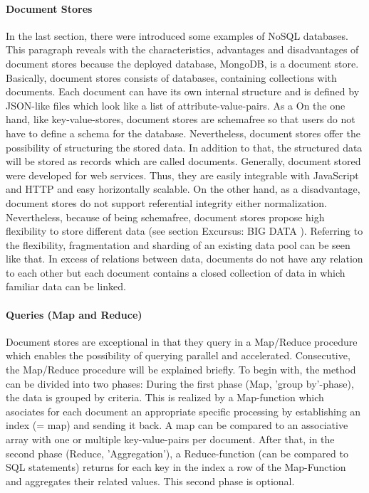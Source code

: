 \paragraph{Document Stores} \label{documentstore}

In the last section, there were introduced some examples of NoSQL databases. This paragraph reveals with the characteristics, advantages and disadvantages of document stores because the deployed database, MongoDB, is a document store. 
Basically, document stores consists of databases, containing collections with documents. Each document can have its own internal structure and is defined by JSON-like files which look like a list of attribute-value-pairs. As a 
On the one hand, like key-value-stores, document stores are schemafree so that users do not have to define a schema for the database. Nevertheless, document stores offer the possibility of structuring the stored data. In addition to that, the structured data will be stored as records which are called documents. Generally, document stored were developed for web services. Thus, they are easily integrable with JavaScript and \ac{HTTP} and easy horizontally scalable. 
On the other hand, as a disadvantage, document stores do not support referential integrity either normalization.
Nevertheless, because of being schemafree, document stores propose high flexibility to store different data (see section Excursus: BIG DATA \pageref{bigdata}). Referring to the flexibility, fragmentation and sharding of an existing data pool can be seen like that. In excess of relations between data, documents do not have any relation to each other but each document contains a closed collection of data in which familiar data can be linked.

\paragraph{Queries (Map and Reduce)}

Document stores are exceptional in that they query in a Map/Reduce procedure which enables the possibility of querying parallel and accelerated. Consecutive, the Map/Reduce procedure will be explained briefly. 
To begin with, the method can be divided into two phases: During the first phase (Map, 'group by'-phase), the data is grouped by criteria. This is realized by a Map-function which asociates for each document an appropriate specific processing by establishing an index (= map) and sending it back. A map can be compared to an associative array with one or multiple key-value-pairs per document.  
After that, in the second phase (Reduce, 'Aggregation'), a Reduce-function (can be compared to SQL statements) returns for each key in the index a row of the Map-Function and aggregates their related values. This second phase is optional.


